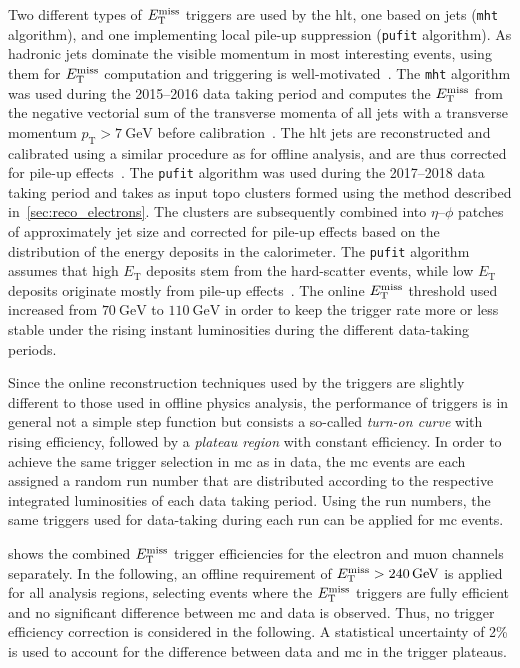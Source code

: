 Two different types of $E_{\textrm{T}}^{\textrm{miss}}$ triggers are used by the \gls{hlt}, one based on jets (\texttt{mht} algorithm), and one implementing local pile-up suppression (\texttt{pufit} algorithm). As hadronic jets dominate the visible momentum in most interesting events, using them for $E_{\textrm{T}}^{\textrm{miss}}$ computation and triggering is well-motivated~\cite{Aad:2020les}. The \texttt{mht} algorithm was used during the 2015--2016 data taking period and computes the $E_{\textrm{T}}^{\textrm{miss}}$ from the negative vectorial sum of the transverse momenta of all jets with a transverse momentum $p_\mathrm{T} > \SI{7}{\GeV}$ before calibration~\cite{Aad:2020les}. The \gls{hlt} jets are reconstructed and calibrated using a similar procedure as for offline analysis, and are thus corrected for pile-up effects~\cite{Aad:2016nrq}. The \texttt{pufit} algorithm was used during the 2017--2018 data taking period and takes as input topo clusters formed using the method described in~\cref{sec:reco_electrons}. The clusters are subsequently combined into $\eta$--$\phi$ patches of approximately jet size and corrected for pile-up effects based on the distribution of the energy deposits in the calorimeter. The \texttt{pufit} algorithm assumes that high $E_\mathrm{T}$ deposits stem from the hard-scatter events, while low $E_\mathrm{T}$ deposits originate mostly from pile-up effects~\cite{Aad:2020les}. The online $E_{\textrm{T}}^{\textrm{miss}}$ threshold used increased from $\SI{70}{\GeV}$ to $\SI{110}{\GeV}$ in order to keep the trigger rate more or less stable under the rising instant luminosities during the different data-taking periods.  

Since the online reconstruction techniques used by the triggers are slightly different to those used in offline physics analysis, the performance of triggers is in general not a simple step function but consists a so-called \textit{turn-on curve} with rising efficiency, followed by a \textit{plateau region} with constant efficiency. In order to achieve the same trigger selection in \gls{mc} as in data, the \gls{mc} events are each assigned a random run number that are distributed according to the respective integrated luminosities of each data taking period. Using the run numbers, the same triggers used for data-taking during each run can be applied for \gls{mc} events. 

 shows the combined $E_{\textrm{T}}^{\textrm{miss}}$ trigger efficiencies for the electron and muon channels separately. In the following, an offline requirement of $\etmiss > \SI{240}{\GeV}$ is applied for all analysis regions, selecting events where the $E_{\textrm{T}}^{\textrm{miss}}$ triggers are fully efficient and no significant difference between \gls{mc} and data is observed. Thus, no trigger efficiency correction is considered in the following. A statistical uncertainty of 2\% is used to account for the difference between data and \gls{mc} in the trigger plateaus.



